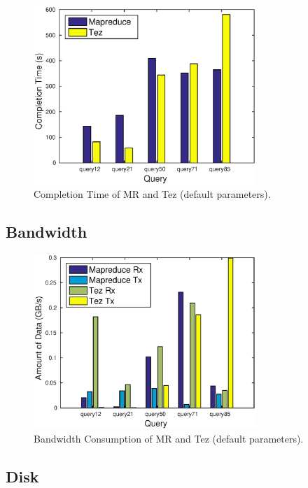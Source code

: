 \documentclass[10pt]{article}
\begin{document}
\begin{figure}
\begin{center}
\includegraphics[width=0.75\textwidth]{pic/q1a_time}
\caption{Completion Time of MR and Tez (default parameters).}
\label{fig:q1a_time}
\end{center}
\end{figure}


\subsection{Bandwidth}

\begin{figure}
\begin{center}
\includegraphics[width=0.75\textwidth]{pic/q1b_net}
\caption{Bandwidth Consumption of MR and Tez (default parameters).}
\label{fig:q1b_net}
\end{center}
\end{figure}

\subsection{Disk}
\end{document}
